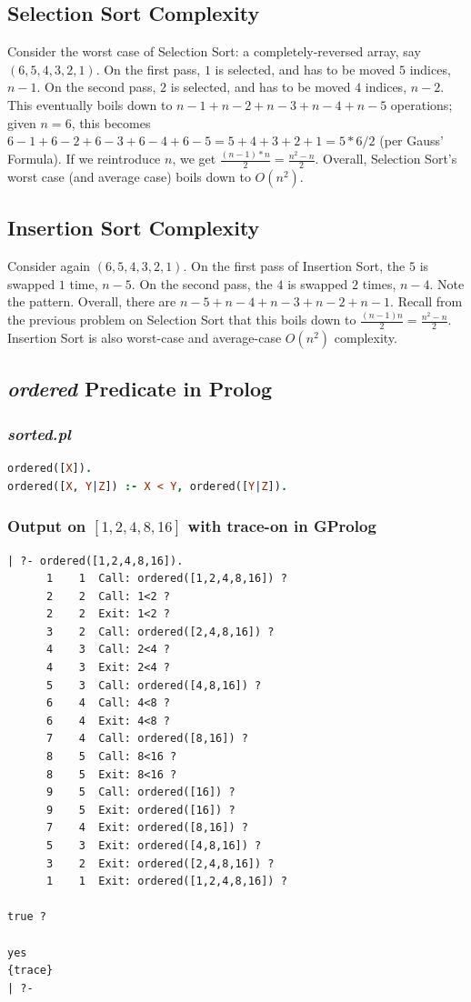 \documentclass[12pt]{article}
\begin{document}
	\subsection{Selection Sort Complexity}
	Consider the worst case of Selection Sort: a completely-reversed array, say $(6, 5, 4, 3, 2, 1)$. On the first pass, $1$ is selected, and has to be moved $5$ indices, $n - 1$. On the second pass, $2$ is selected, and has to be moved $4$ indices, $n - 2$. This eventually boils down to $n - 1 + n - 2 + n - 3 + n - 4 + n - 5$ operations; given $n = 6$, this becomes $6 - 1 + 6 - 2 + 6 - 3 + 6 - 4 + 6 - 5 = 5 + 4 + 3 + 2 + 1 = 5 * 6 / 2$ (per Gauss' Formula). If we reintroduce $n$, we get $\frac{(n - 1) * n}{2} = \frac{n^2 - n}{2}$. Overall, Selection Sort's worst case (and average case) boils down to $O(n^2)$.

	\subsection{Insertion Sort Complexity}
	Consider again $(6, 5, 4, 3, 2, 1)$. On the first pass of Insertion Sort, the $5$ is swapped $1$ time, $n - 5$. On the second pass, the $4$ is swapped $2$ times, $n - 4$. Note the pattern. Overall, there are $n - 5 + n - 4 + n - 3 + n - 2 + n - 1$. Recall from the previous problem on Selection Sort that this boils down to $\frac{(n - 1)n}{2} = \frac{n^2 - n}{2}$. Insertion Sort is also worst-case and average-case $O(n^2)$ complexity.

	\subsection{\textit{ordered} Predicate in Prolog}
	\subsubsection{\textit{sorted.pl}}
	\begin{lstlisting}[language = Prolog]
ordered([X]).
ordered([X, Y|Z]) :- X < Y, ordered([Y|Z]).
	\end{lstlisting}

	\subsubsection{Output on $[1, 2, 4, 8, 16]$ with trace-on in GProlog}
	\begin{lstlisting}
| ?- ordered([1,2,4,8,16]).
      1    1  Call: ordered([1,2,4,8,16]) ?
      2    2  Call: 1<2 ?
      2    2  Exit: 1<2 ?
      3    2  Call: ordered([2,4,8,16]) ?
      4    3  Call: 2<4 ?
      4    3  Exit: 2<4 ?
      5    3  Call: ordered([4,8,16]) ?
      6    4  Call: 4<8 ?
      6    4  Exit: 4<8 ?
      7    4  Call: ordered([8,16]) ?
      8    5  Call: 8<16 ?
      8    5  Exit: 8<16 ?
      9    5  Call: ordered([16]) ?
      9    5  Exit: ordered([16]) ?
      7    4  Exit: ordered([8,16]) ?
      5    3  Exit: ordered([4,8,16]) ?
      3    2  Exit: ordered([2,4,8,16]) ?
      1    1  Exit: ordered([1,2,4,8,16]) ?

true ?

yes
{trace}
| ?-
	\end{lstlisting}
	\pagebreak
\end{document}
